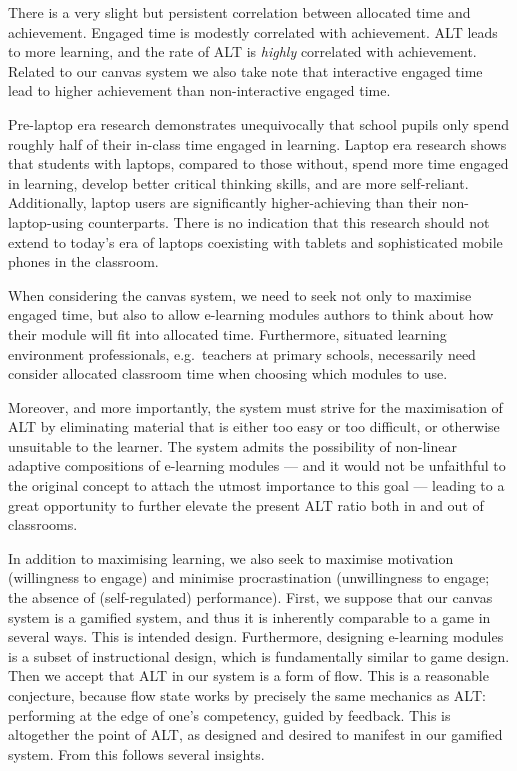 \documentclass{article}
\begin{document}
\begin{multicols}{2}
There is a very slight but persistent correlation between allocated time and 
achievement\cite{cotton1981time, walberg1988synthesis, cotton1990educational}. 
Engaged time is modestly correlated with achievement\cite{cotton1981time, 
sanford1983time, cotton1990educational}. ALT leads to more 
learning\cite{walberg1988synthesis}, and the rate of ALT is \emph{highly} 
correlated with achievement\cite{cotton1981time, sanford1983time, 
walberg1988synthesis, cotton1990educational}. Related to our canvas system we 
also take note that interactive engaged time lead to higher achievement than 
non-interactive engaged time\cite{sanford1983time, cotton1990educational}.

Pre-laptop era research demonstrates unequivocally that school pupils only 
spend roughly half of their in-class time engaged in 
learning\cite{cotton1990educational}. Laptop era research shows that students 
with laptops, compared to those without, spend more time engaged in learning, 
develop better critical thinking skills, and are more self-reliant. 
Additionally, laptop users are significantly higher-achieving than their 
non-laptop-using counterparts\cite{cengiz2005learning}. There is no indication 
that this research should not extend to today's era of laptops coexisting with 
tablets and sophisticated mobile phones in the classroom.

When considering the canvas system, we need to seek not only to maximise 
engaged time, but also to allow e-learning modules authors to think about how 
their module will fit into allocated time. Furthermore, situated learning 
environment professionals, e.g.\ teachers at primary schools, necessarily need 
consider allocated classroom time when choosing which modules to use. 

Moreover, and more importantly, the system must strive for the maximisation of 
ALT by eliminating material that is either too easy or too difficult, or 
otherwise unsuitable to the learner. The system admits the possibility of 
non-linear adaptive compositions of e-learning modules --- and it would not be 
unfaithful to the original concept to attach the utmost importance to this 
goal --- leading to a great opportunity to further elevate the present ALT 
ratio both in and out of classrooms.

In addition to maximising learning, we also seek to maximise motivation 
(willingness to engage) and minimise procrastination (unwillingness to engage; 
the absence of (self-regulated) performance\cite{lee2005relationship}). First, 
we suppose that our canvas system is a gamified system, and thus it is 
inherently comparable to a game in several ways\cite{deterding2011game}. This 
is intended design\cite{berntsen2015enabling}. Furthermore, designing 
e-learning modules is a subset of instructional design, which is fundamentally 
similar to game design\cite{murphy2011games}. Then we accept that ALT in our 
system is a form of flow. This is a reasonable conjecture, because flow state 
works by precisely the same mechanics as ALT: performing at the edge of one's 
competency, guided by feedback\cite{rutledgepositive}. This is altogether the 
point of ALT, as designed and desired to manifest in our gamified system. From 
this follows several insights.


\end{multicols}
\end{document}
